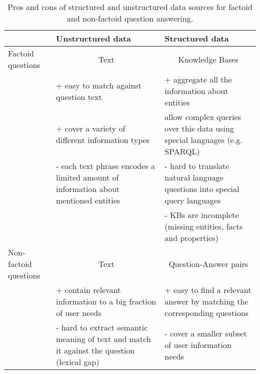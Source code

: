 \begin{table}[h!t]
	\centering
	\small
	\begin{tabular}{p{2cm}|p{5.3cm}|p{5.3cm}}
		& Unstructured data & Structured data \\
		\hline
		Factoid questions & \multicolumn{1}{|c|}{Text} & \multicolumn{1}{|c}{Knowledge Bases} \\
		& + easy to match against question text & + aggregate all the information about entities\\
		& + cover a variety of different information types & allow complex queries over this data using special languages (e.g. SPARQL) \\
		& - each text phrase encodes a limited amount of information about mentioned entities & - hard to translate natural language questions into special query languages \\
		&  & - KBs are incomplete (missing entities, facts and properties) \\
		\hline
		Non-factoid questions & \multicolumn{1}{|c|}{Text} & \multicolumn{1}{|c}{Question-Answer pairs} \\
		& + contain relevant information to a big fraction of user needs & + easy to find a relevant answer by matching the corresponding questions \\
		& - hard to extract semantic meaning of text and match it against the question (lexical gap) & - cover a smaller subset of user information needs \\
	\end{tabular}
	\caption{Pros and cons of structured and unstructured data sources for factoid and non-factoid question answering.}
	\label{table:intro:data_procons}
\end{table}

